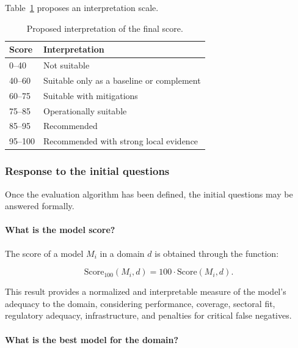 \documentclass[11pt,a4paper]{article}
\begin{document}
Table~\ref{tab:interpretacion_score} proposes an interpretation scale.

\begin{table}[h]
    \centering
    \caption{Proposed interpretation of the final score.}
    \label{tab:interpretacion_score}
    \renewcommand{\arraystretch}{1.2}
    \begin{tabular}{ll}
        \toprule
        \textbf{Score} & \textbf{Interpretation} \\
        \midrule
        0--40 & Not suitable \\
        40--60 & Suitable only as a baseline or complement \\
        60--75 & Suitable with mitigations \\
        75--85 & Operationally suitable \\
        85--95 & Recommended \\
        95--100 & Recommended with strong local evidence \\
        \bottomrule
    \end{tabular}
\end{table}

\subsubsection{Response to the initial questions}

Once the evaluation algorithm has been defined, the initial questions may be answered formally.

\paragraph{What is the model score?}

The score of a model $M_i$ in a domain $d$ is obtained through the function:

\begin{equation}
    \mathrm{Score}_{100}(M_i,d)=100\cdot \mathrm{Score}(M_i,d).
\end{equation}

This result provides a normalized and interpretable measure of the model’s adequacy to the domain, considering performance, coverage, sectoral fit, regulatory adequacy, infrastructure, and penalties for critical false negatives.

\paragraph{What is the best model for the domain?}
\end{document}
